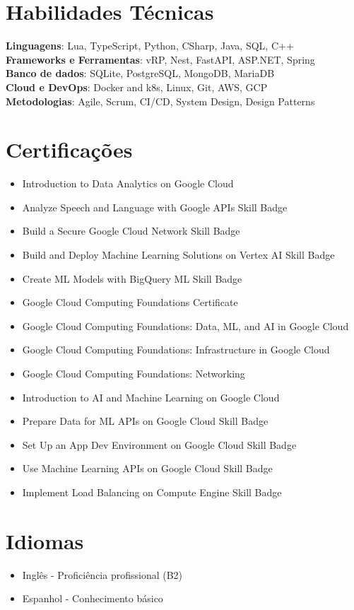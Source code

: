 \documentclass[letterpaper,11pt]{article}
\newcommand{\resumeItem}[1]{
  \item\small{
    {#1 \vspace{-2pt}}
  }
}
\newcommand{\resumeSubHeadingListStart}{\begin{itemize}[leftmargin=0.0in, label={}]}
\newcommand{\resumeSubHeadingListEnd}{\end{itemize}}
\begin{document}
\section{Habilidades Técnicas}
 \begin{itemize}[leftmargin=0.15in, label={}]
    \small{\item{
     \textbf{Linguagens}{: Lua, TypeScript, Python, CSharp, Java, SQL, C++} \\ 
     \textbf{Frameworks e Ferramentas}{: vRP, Nest, FastAPI, ASP.NET, Spring} \\ 
     \textbf{Banco de dados}{: SQLite, PostgreSQL, MongoDB, MariaDB} \\ 
     \textbf{Cloud e DevOps}{: Docker and k8s, Linux, Git, AWS, GCP} \\ 
     \textbf{Metodologias}{: Agile, Scrum, CI/CD, System Design, Design Patterns} \\ 
    }}
 \end{itemize}
 \vspace{-16pt}

\section{Certificações}
  \resumeSubHeadingListStart
 \begin{itemize}[leftmargin=0.15in, label={}]
        \resumeItem{Introduction to Data Analytics on Google Cloud}
        \resumeItem{Analyze Speech and Language with Google APIs Skill Badge}
        \resumeItem{Build a Secure Google Cloud Network Skill Badge}
        \resumeItem{Build and Deploy Machine Learning Solutions on Vertex AI Skill Badge}
        \resumeItem{Create ML Models with BigQuery ML Skill Badge}
        \resumeItem{Google Cloud Computing Foundations Certificate}
        \resumeItem{Google Cloud Computing Foundations: Data, ML, and AI in Google Cloud}
        \resumeItem{Google Cloud Computing Foundations: Infrastructure in Google Cloud}
        \resumeItem{Google Cloud Computing Foundations: Networking}
        \resumeItem{Introduction to AI and Machine Learning on Google Cloud}
        \resumeItem{Prepare Data for ML APIs on Google Cloud Skill Badge}
        \resumeItem{Set Up an App Dev Environment on Google Cloud Skill Badge}
        \resumeItem{Use Machine Learning APIs on Google Cloud Skill Badge}
        \resumeItem{Implement Load Balancing on Compute Engine Skill Badge}
    \end{itemize}
  \resumeSubHeadingListEnd
\vspace{-16pt}

\section{Idiomas}
  \resumeSubHeadingListStart
    \resumeItem{Inglês - Proficiência profissional (B2)}
    \resumeItem{Espanhol - Conhecimento básico}
  \resumeSubHeadingListEnd
\vspace{-16pt}
\end{document}
